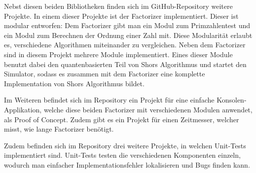 Nebst diesen beiden Bibliotheken finden sich im GitHub-Repository weitere Projekte. In einem dieser Projekte ist der \grqq Factorizer\grqq{} implementiert. Dieser ist modular entworfen: Dem Factorizer gibt man ein Modul zum Primzahlentest und ein Modul zum Berechnen der Ordnung einer Zahl mit. %
Diese Modularität erlaubt es, verschiedene Algorithmen miteinander zu vergleichen. Neben dem \grqq Factorizer\grqq{} sind in diesem Projekt mehrere Module implementiert. Eines dieser Module benutzt dabei den quantenbasierten Teil von Shors Algorithmus und startet den Simulator, sodass es zusammen mit dem \grqq Factorizer\grqq{} eine komplette Implementation von Shors Algorithmus bildet.

Im Weiteren befindet sich im Repository ein Projekt für eine einfache Konsolen-Applikation, welche diese beiden \grqq Factorizer\grqq{} mit verschiedenen Modulen anwendet, als Proof of Concept. Zudem gibt es ein Projekt für einen Zeitmesser, welcher misst, wie lange \grqq Factorizer \grqq{} benötigt.

Zudem befinden sich im Repository drei weitere Projekte, in welchen Unit-Tests implementiert sind. Unit-Tests testen die verschiedenen Komponenten einzeln, wodurch man einfacher Implementationsfehler lokalisieren und Bugs finden kann.